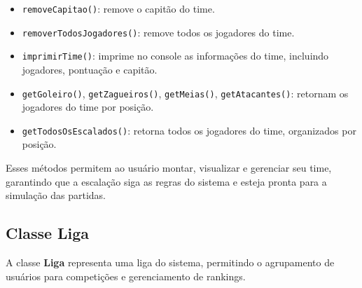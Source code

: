 \documentclass[12pt]{article}
\begin{document}
\begin{itemize}
\begin{itemize}
          \item \texttt{removeCapitao()}: remove o capitão do time.
          \item \texttt{removerTodosJogadores()}: remove todos os jogadores do time.
          \item \texttt{imprimirTime()}: imprime no console as informações do time, incluindo jogadores, pontuação e capitão.
          \item \texttt{getGoleiro()}, \texttt{getZagueiros()}, \texttt{getMeias()}, \texttt{getAtacantes()}: retornam os jogadores do time por posição.
          \item \texttt{getTodosOsEscalados()}: retorna todos os jogadores do time, organizados por posição.
        \end{itemize}
\end{itemize}

Esses métodos permitem ao usuário montar, visualizar e gerenciar seu time, garantindo que a escalação siga as regras do sistema e esteja pronta para a simulação das partidas.

\subsection{Classe Liga}

A classe \textbf{Liga} representa uma liga do sistema, permitindo o agrupamento de usuários para competições e gerenciamento de rankings.
\end{document}
